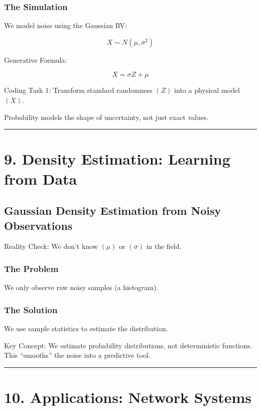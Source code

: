 \documentclass[12pt]{article}
\begin{document}
\subsubsection*{\textbf{The Simulation}}

We model noise using the Gaussian RV:

\[
X\sim N(\mu,\sigma^2)
\]

Generative Formula:

\[
X=\sigma Z+\mu
\]

Coding Task 1: Transform standard randomness $(Z)$ into a physical model $(X)$.

Probability models the shape of uncertainty, not just exact values.

\hrule
\vspace{1em}

\section*{\textbf{9. Density Estimation: Learning from Data}}

\subsection*{\textbf{Gaussian Density Estimation from Noisy Observations}}

Reality Check: We don’t know $(\mu)$ or $(\sigma)$ in the field.

\subsubsection*{\textbf{The Problem}}

We only observe raw noisy samples (a histogram).

\subsubsection*{\textbf{The Solution}}

We use sample statistics to estimate the distribution.

Key Concept: We estimate probability distributions, not deterministic functions.\\
This “smooths” the noise into a predictive tool.

\hrule
\vspace{1em}

\section*{\textbf{10. Applications: Network Systems}}
\end{document}
